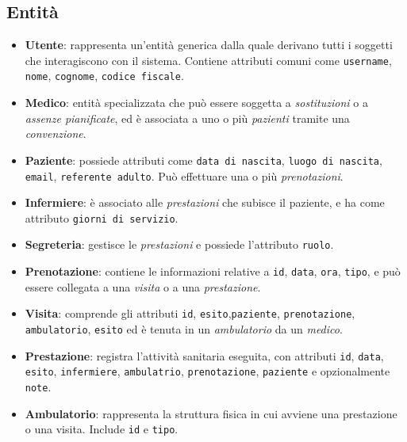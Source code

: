 \documentclass[a4paper,12pt]{article}
\begin{document}
\subsection{Entità}

\begin{itemize}
    \item \textbf{Utente}: rappresenta un’entità generica dalla quale derivano tutti i soggetti che interagiscono con il sistema. 
    Contiene attributi comuni come \texttt{username}, \texttt{nome}, \texttt{cognome}, \texttt{codice fiscale}.
    
    \item \textbf{Medico}: entità specializzata che può essere soggetta a \textit{sostituzioni} o a \textit{assenze pianificate}, 
    ed è associata a uno o più \textit{pazienti} tramite una \textit{convenzione}.
    
    \item \textbf{Paziente}: possiede attributi come \texttt{data di nascita}, \texttt{luogo di nascita}, \texttt{email}, \texttt{referente adulto}. Può effettuare una o più \textit{prenotazioni}.
    
    \item \textbf{Infermiere}: è associato alle \textit{prestazioni} che subisce il paziente, e ha come attributo \texttt{giorni di servizio}.
    
    \item \textbf{Segreteria}: gestisce le \textit{prestazioni} e possiede l’attributo \texttt{ruolo}.
    
    \item \textbf{Prenotazione}: contiene le informazioni relative a \texttt{id}, \texttt{data}, \texttt{ora}, \texttt{tipo}, 
    e può essere collegata a una \textit{visita} o a una \textit{prestazione}.
    
    \item \textbf{Visita}: comprende gli attributi \texttt{id}, \texttt{esito},\texttt{paziente}, \texttt{prenotazione}, \texttt{ambulatorio}, \texttt{esito} ed è tenuta in un \textit{ambulatorio} da un \textit{medico}.
    
    \item \textbf{Prestazione}: registra l’attività sanitaria eseguita, con attributi \texttt{id}, \texttt{data}, \texttt{esito}, \texttt{infermiere}, \texttt{ambulatrio}, \texttt{prenotazione}, \texttt{paziente} e opzionalmente
    \texttt{note}.
    
    \item \textbf{Ambulatorio}: rappresenta la struttura fisica in cui avviene una prestazione o una visita. 
    Include \texttt{id} e \texttt{tipo}.
\end{itemize}
\end{document}
